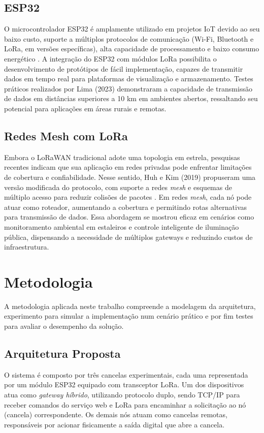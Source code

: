 \documentclass[
article,			%
11pt,				%
twoside,			%
a4paper,			%
section=TITLE,		%
onecolumn,          %
english,			%
brazil,				%
sumario=tradicional
]{abntex2}
\begin{document}
    \subsection{ESP32}
    O microcontrolador ESP32 é amplamente utilizado em projetos IoT devido ao seu baixo custo, suporte a múltiplos protocolos de comunicação (Wi-Fi, Bluetooth e LoRa, em versões específicas), alta capacidade de processamento e baixo consumo energético \cite{lima2023}. A integração do ESP32 com módulos LoRa possibilita o desenvolvimento de protótipos de fácil implementação, capazes de transmitir dados em tempo real para plataformas de visualização e armazenamento. Testes práticos realizados por Lima (2023) demonstraram a capacidade de transmissão de dados em distâncias superiores a 10 km em ambientes abertos, ressaltando seu potencial para aplicações em áreas rurais e remotas.

    \subsection{Redes Mesh com LoRa}
    Embora o LoRaWAN tradicional adote uma topologia em estrela, pesquisas recentes indicam que sua aplicação em redes privadas pode enfrentar limitações de cobertura e confiabilidade. Nesse sentido, Huh e Kim (2019) propuseram uma versão modificada do protocolo, com suporte a redes \textit{mesh} e esquemas de múltiplo acesso para reduzir colisões de pacotes \cite{huh2019}. Em redes \textit{mesh}, cada nó pode atuar como roteador, aumentando a cobertura e permitindo rotas alternativas para transmissão de dados. Essa abordagem se mostrou eficaz em cenários como monitoramento ambiental em estaleiros e controle inteligente de iluminação pública, dispensando a necessidade de múltiplos gateways e reduzindo custos de infraestrutura.

\section{Metodologia}

    A metodologia aplicada neste trabalho compreende a modelagem da arquitetura, experimento para simular a implementação num cenário prático e por fim testes para avaliar o desempenho da solução.
    
    \subsection{Arquitetura Proposta}
    O sistema é composto por três cancelas experimentais, cada uma representada por um módulo ESP32 equipado com transceptor LoRa. Um dos dispositivos atua como \textit{gateway híbrido}, utilizando protocolo duplo, sendo TCP/IP para receber comandos do serviço web e LoRa para encaminhar a solicitação ao nó (cancela) correspondente. Os demais nós atuam como cancelas remotas, responsáveis por acionar fisicamente a saída digital que abre a cancela.
\end{document}
